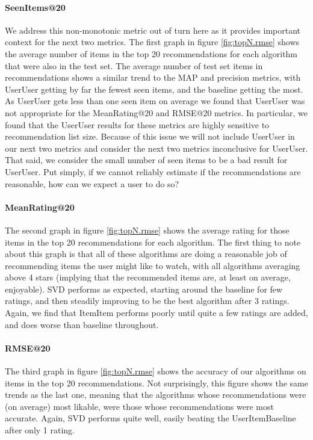 \documentclass[letterpaper]{sig-alternate}
\begin{document}
  \paragraph{SeenItems@20}
  We address this non-monotonic metric out of turn here as it provides important context for the next two metrics.
  The first graph in figure \ref{fig:topN.rmse} shows the average number of items in the top 20 recommendations for each algorithm that were also in the test set.
  The average number of test set items in recommendations shows a similar trend to the MAP and precision metrics, with UserUser getting by far the fewest seen items, and the baseline getting the most.
  As UserUser gets less than one seen item on average we found that UserUser was not appropriate for the MeanRating@20 and RMSE@20 metrics.
  In particular, we found that the UserUser results for these metrics are highly sensitive to recommendation list size.
  Because of this issue we will not include UserUser in our next two metrics and consider the next two metrics inconclusive for UserUser.
  That said, we consider the small number of seen items to be a bad result for UserUser.
  Put simply, if we cannot reliably estimate if the recommendations are reasonable, how can we expect a user to do so?

  \paragraph{MeanRating@20}
  The second graph in figure \ref{fig:topN.rmse} shows the average rating for those items in the top 20 recommendations for each algorithm.
  The first thing to note about this graph is that all of these algorithms are doing a reasonable job of recommending items the user might like to watch, with all algorithms averaging above 4 stars (implying that the recommended items are, at least on average, enjoyable).
  SVD performs as expected, starting around the baseline for few ratings, and then steadily improving to be the best algorithm after 3 ratings.
  Again, we find that ItemItem performs poorly until quite a few ratings are added, and does worse than baseline throughout.
    

  \paragraph{RMSE@20}
  The third graph in figure \ref{fig:topN.rmse} shows the accuracy of our algorithms on items in the top 20 recommendations.
  Not surprisingly, this figure shows the same trends as the last one, meaning that the algorithms whose recommendations were (on average) most likable, were those whose recommendations were most accurate.
  Again, SVD performs quite well, easily beating the UserItemBaseline after only 1 rating.
  
\end{document}
